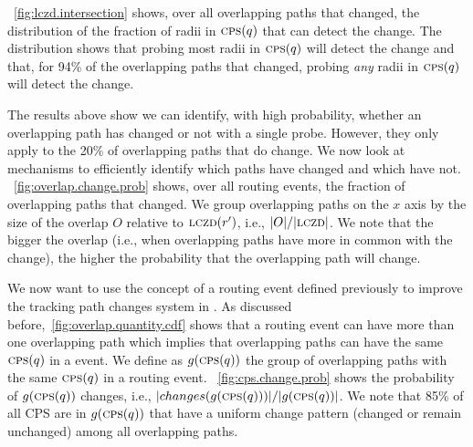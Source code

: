 


\figstr~\ref{fig:lczd.intersection} shows, over all overlapping
paths that changed, the distribution of the fraction of radii in
$\mathrm{\textsc{cps}}(q)$ that can detect the change.  The distribution shows that
probing most radii in $\mathrm{\textsc{cps}}(q)$ will detect the change and
that, for 94\% of the overlapping paths that changed, probing
\emph{any} radii in $\mathrm{\textsc{cps}}(q)$ will detect the change.

 The results above show we
can identify, with high probability, whether an overlapping path has
changed or not with a single probe.  However, they only apply to the
20\% of overlapping paths that do change.  We now look at mechanisms
to efficiently identify which paths have changed and which have not.
\figstr~\ref{fig:overlap.change.prob} shows, over all routing
events, the fraction of overlapping paths that changed.  We group
overlapping paths on the $x$ axis by the size of the overlap $O$
relative to $\mathrm{\textsc{lczd}}(r')$, i.e., $|O|/|\mathrm{\textsc{lczd}}|$.  We note that the
bigger the overlap (i.e., when overlapping paths have more in common
with the change), the higher the probability that the overlapping
path will change.  

 We
now want to use the concept of a routing event defined
previously to improve the tracking path changes system
in \dtrack. As discussed before,\figstr~\ref{fig:overlap.quantity.cdf}  
shows that a routing event can have more than one overlapping path
which implies that overlapping paths can have the same
$\mathrm{\textsc{cps}}(q)$ in a event. We define as $g(\mathrm{\textsc{cps}}(q))$ the group of overlapping paths
with the same $\mathrm{\textsc{cps}}(q)$ in a routing event.
\figstr~\ref{fig:cps.change.prob} shows the probability of 
$g(\mathrm{\textsc{cps}}(q))$ changes, i.e., $|changes(g(\mathrm{\textsc{cps}}(q)))|/|g(\mathrm{\textsc{cps}}(q))|$. 
We note that 85\% of all CPS are in $g(\mathrm{\textsc{cps}}(q))$ that have a uniform change
pattern (changed or remain unchanged) among all overlapping
paths. 

